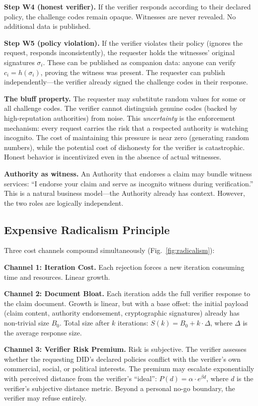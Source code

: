 \documentclass[11pt,a4paper,twocolumn]{article}
\begin{document}
\textbf{Step W4 (honest verifier).} If the verifier responds according to their declared policy, the challenge codes remain opaque. Witnesses are never revealed. No additional data is published.

\textbf{Step W5 (policy violation).} If the verifier violates their policy (ignores the request, responds inconsistently), the requester holds the witnesses' original signatures $\sigma_i$. These can be published as companion data: anyone can verify $c_i = h(\sigma_i)$, proving the witness was present. The requester can publish independently---the verifier already signed the challenge codes in their response.

\textbf{The bluff property.} The requester may substitute random values for some or all challenge codes. The verifier cannot distinguish genuine codes (backed by high-reputation authorities) from noise. This \emph{uncertainty} is the enforcement mechanism: every request carries the risk that a respected authority is watching incognito. The cost of maintaining this pressure is near zero (generating random numbers), while the potential cost of dishonesty for the verifier is catastrophic. Honest behavior is incentivized even in the absence of actual witnesses.

\textbf{Authority as witness.} An Authority that endorses a claim may bundle witness services: ``I endorse your claim and serve as incognito witness during verification.'' This is a natural business model---the Authority already has context. However, the two roles are logically independent.

\subsection{Expensive Radicalism Principle}

Three cost channels compound simultaneously (Fig.~\ref{fig:radicalism}):

\textbf{Channel 1: Iteration Cost.} Each rejection forces a new iteration consuming time and resources. Linear growth.

\textbf{Channel 2: Document Bloat.} Each iteration adds the full verifier response to the claim document. Growth is linear, but with a base offset: the initial payload (claim content, authority endorsement, cryptographic signatures) already has non-trivial size $B_0$. Total size after $k$ iterations: $S(k) = B_0 + k \cdot \Delta$, where $\Delta$ is the average response size.

\textbf{Channel 3: Verifier Risk Premium.} Risk is subjective. The verifier assesses whether the requesting DID's declared policies conflict with the verifier's own commercial, social, or political interests. The premium may escalate exponentially with perceived distance from the verifier's ``ideal'': $P(d) = \alpha \cdot e^{\beta d}$, where $d$ is the verifier's subjective distance metric. Beyond a personal no-go boundary, the verifier may refuse entirely.
\end{document}

